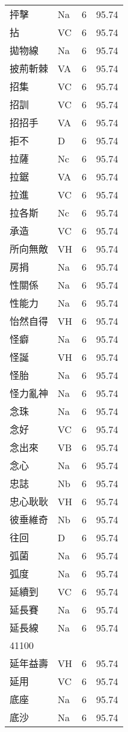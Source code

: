 \documentclass[twocolumn]{book}
\begin{document}
\begin{supertabular}{llrr}
抨擊 & Na & 6 &  95.74\\
拈 & VC & 6 &  95.74\\
拋物線 & Na & 6 &  95.74\\
披荊斬棘 & VA & 6 &  95.74\\
招集 & VC & 6 &  95.74\\
招訓 & VC & 6 &  95.74\\
招招手 & VA & 6 &  95.74\\
拒不 & D & 6 &  95.74\\
拉薩 & Nc & 6 &  95.74\\
拉鋸 & VA & 6 &  95.74\\
拉進 & VC & 6 &  95.74\\
拉各斯 & Nc & 6 &  95.74\\
承造 & VC & 6 &  95.74\\
所向無敵 & VH & 6 &  95.74\\
房捐 & Na & 6 &  95.74\\
性關係 & Na & 6 &  95.74\\
性能力 & Na & 6 &  95.74\\
怡然自得 & VH & 6 &  95.74\\
怪癖 & Na & 6 &  95.74\\
怪誕 & VH & 6 &  95.74\\
怪胎 & Na & 6 &  95.74\\
怪力亂神 & Na & 6 &  95.74\\
念珠 & Na & 6 &  95.74\\
念好 & VC & 6 &  95.74\\
念出來 & VB & 6 &  95.74\\
念心 & Na & 6 &  95.74\\
忠誌 & Nb & 6 &  95.74\\
忠心耿耿 & VH & 6 &  95.74\\
彼垂維奇 & Nb & 6 &  95.74\\
往回 & D & 6 &  95.74\\
弧菌 & Na & 6 &  95.74\\
弧度 & Na & 6 &  95.74\\
延續到 & VC & 6 &  95.74\\
延長賽 & Na & 6 &  95.74\\
延長線 & Na & 6 &  95.74\\
41100\\
延年益壽 & VH & 6 &  95.74\\
延用 & VC & 6 &  95.74\\
底座 & Na & 6 &  95.74\\
底沙 & Na & 6 &  95.74\\

\end{supertabular}
\end{document}

